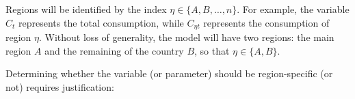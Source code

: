 \documentclass[
	thesis.tex
	]{subfiles}
\begin{document}

Regions will be identified by the index $\eta \in \{A,B,\ldots,n\}$. For example, the variable $C_t$ represents the total consumption, while $C_{\eta t}$ represents the consumption of region $\eta$. Without loss of generality, the model will have two regions: the main region $A$ and the remaining of the country $B$, so that $\eta \in \{A,B\}$.

Determining whether the variable (or parameter) should be region-specific (or not) requires justification:


\end{document}

